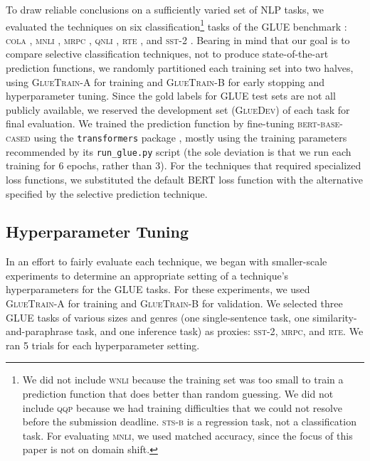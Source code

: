 \documentclass[11pt]{article}
\begin{document}
To draw reliable conclusions on a sufficiently varied set of NLP tasks, we evaluated the techniques on six classification\footnote{We did not include \textsc{wnli} because the training set was too small to train a prediction function that does better than random guessing. We did not include \textsc{qqp} because we had training difficulties that we could not resolve before the submission deadline. \textsc{sts-b} is a regression task, not a classification task. For evaluating \textsc{mnli}, we used matched accuracy, since the focus of this paper is not on domain shift.} tasks of the \textsc{GLUE} benchmark \cite{wang-etal-2018-glue}: \textsc{cola} \cite{warstadt-etal-2019-neural}, \textsc{mnli} \cite{williams-etal-2018-broad}, \textsc{mrpc} \cite{dolan-brockett-2005-automatically}, \textsc{qnli} \cite{rajpurkar-etal-2016-squad}, \textsc{rte} \cite{dagan2005pascal,giampiccolo-etal-2007-third,bentivogli2009fifth}, and \textsc{sst-2} \cite{socher-etal-2013-recursive}. Bearing in mind that our goal is to compare selective classification techniques, not to produce state-of-the-art prediction functions, we randomly partitioned each training set into two halves, using \textsc{GlueTrain-A} for training and \textsc{GlueTrain-B} for early stopping and hyperparameter tuning. Since the gold labels for GLUE test sets are not all publicly available, we reserved the development set (\textsc{GlueDev}) of each task for final evaluation. We trained the prediction function by fine-tuning \textsc{bert-base-cased} using the \texttt{transformers} package \cite{wolf-etal-2020-transformers}, mostly using the training parameters recommended by its \texttt{run\_glue.py} script (the sole deviation is that we run each training for 6 epochs, rather than 3). For the techniques that required specialized loss functions, we substituted the default \textsc{BERT} loss function with the alternative specified by the selective prediction technique. 

\subsection{Hyperparameter Tuning}

In an effort to fairly evaluate each technique, we began with smaller-scale experiments to determine an appropriate setting of a technique's hyperparameters for the \textsc{GLUE} tasks. For these experiments, we used \textsc{GlueTrain-A} for training and \textsc{GlueTrain-B} for validation. We selected three \textsc{GLUE} tasks of various sizes and genres (one single-sentence task, one similarity-and-paraphrase task, and one inference task) as proxies: \textsc{sst-2}, \textsc{mrpc}, and \textsc{rte}. We ran 5 trials for each hyperparameter setting.
\end{document}

